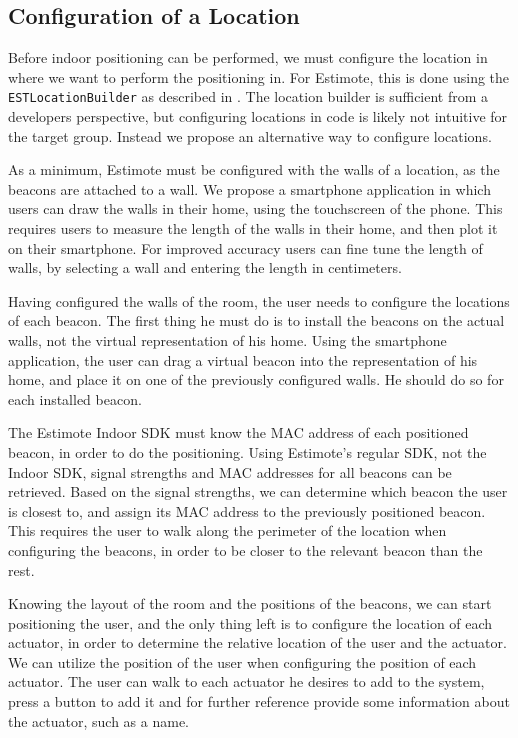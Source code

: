 \subsection{Configuration of a Location}

Before indoor positioning can be performed, 
we must configure the location in where we want to perform the positioning in. 
For Estimote, this is done using the \texttt{ESTLocationBuilder} as described in . 
The location builder is sufficient from a developers perspective, 
but configuring locations in code is likely not intuitive for the target group. 
Instead we propose an alternative way to configure locations.

As a minimum, Estimote must be configured with the walls of a location, 
as the beacons are attached to a wall. 
We propose a smartphone application in which users can draw the walls in their home, 
using the touchscreen of the phone. 
This requires users to measure the length of the walls in their home, 
and then plot it on their smartphone. 
For improved accuracy users can fine tune the length of walls, 
by selecting a wall and entering the length in centimeters.

Having configured the walls of the room, 
the user needs to configure the locations of each beacon. 
The first thing he must do is to install the beacons on the actual walls, 
\ie not the virtual representation of his home.
Using the smartphone application, the user can drag a virtual beacon into the representation of his home, 
and place it on one of the previously configured walls. 
He should do so for each installed beacon.


The Estimote Indoor SDK must know the MAC address of each positioned beacon, 
in order to do the positioning. 
Using Estimote's regular SDK, \ie not the Indoor SDK, 
signal strengths and MAC addresses for all beacons can be retrieved. 
Based on the signal strengths, 
we can determine which beacon the user is closest to, 
and assign its MAC address to the previously positioned beacon. 
This requires the user to walk along the perimeter of the location when configuring the beacons, 
in order to be closer to the relevant beacon than the rest.

Knowing the layout of the room and the positions of the beacons, 
we can start positioning the user, 
and the only thing left is to configure the location of each actuator, 
in order to determine the relative location of the user and the actuator. 
We can utilize the position of the user when configuring the position of each actuator. 
The user can walk to each actuator he desires to add to the system, 
press a button to add it and for further reference provide some information about the actuator, such as a name.

